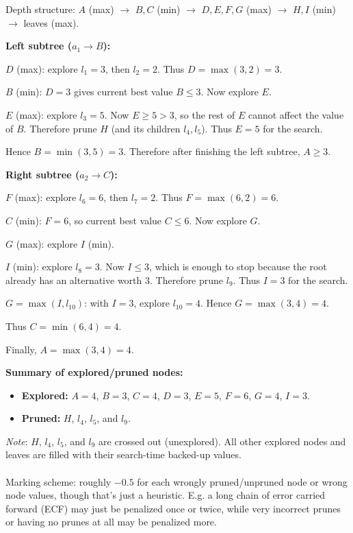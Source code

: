 \begin{solution}
Depth structure: $A$ (max) $\to$ $B,C$ (min) $\to$ $D,E,F,G$ (max) $\to$ $H,I$ (min) $\to$ leaves (max).

\medskip
\noindent \textbf{Left subtree ($a_1 \to B$):}

\smallskip
$D$ (max): explore $l_1=3$, then $l_2=2$. Thus $D = \max(3,2) = 3$.

$B$ (min): $D=3$ gives current best value $B \le 3$. Now explore $E$.

$E$ (max): explore $l_3=5$. Now $E \ge 5 > 3$, so the rest of $E$ cannot affect the value of $B$. Therefore prune $H$ (and its children $l_4, l_5$). Thus $E = 5$ for the search.

Hence $B = \min(3, 5) = 3$. Therefore after finishing the left subtree, $A \ge 3$.

\medskip
\noindent \textbf{Right subtree ($a_2 \to C$):}

\smallskip
$F$ (max): explore $l_6=6$, then $l_7=2$. Thus $F = \max(6,2) = 6$.

$C$ (min): $F=6$, so current best value $C \le 6$. Now explore $G$.

$G$ (max): explore $I$ (min).

$I$ (min): explore $l_8=3$. Now $I \le 3$, which is enough to stop because the root already has an alternative worth $3$. Therefore prune $l_9$. Thus $I = 3$ for the search.

$G = \max(I, l_{10})$: with $I=3$, explore $l_{10}=4$. Hence $G = \max(3,4) = 4$.

Thus $C = \min(6, 4) = 4$.

Finally, $A = \max(3, 4) = 4$.

\medskip
\noindent \textbf{Summary of explored/pruned nodes:}
\begin{itemize}
  \item \textbf{Explored:} $A=4$, $B=3$, $C=4$, $D=3$, $E=5$, $F=6$, $G=4$, $I=3$.
  \item \textbf{Pruned:} $H$, $l_4$, $l_5$, and $l_9$.
\end{itemize}

\medskip
\noindent \textit{Note}: $H$, $l_4$, $l_5$, and $l_9$ are crossed out (unexplored). All other explored nodes and leaves are filled with their search-time backed-up values.
\\~\\
\noindent Marking scheme: roughly $-0.5$ for each wrongly pruned/unpruned node or wrong node values, though that's just a heuristic. E.g. a long chain of error carried forward (ECF) may just be penalized once or twice, while very incorrect prunes or having no prunes at all may be penalized more.
\end{solution}


